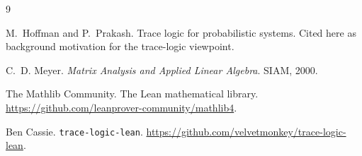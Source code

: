 \documentclass[11pt]{article}
\begin{document}
\begin{thebibliography}{9}

M.~Hoffman and P.~Prakash.
\newblock Trace logic for probabilistic systems.
\newblock Cited here as background motivation for the trace-logic viewpoint.

C.~D. Meyer.
\newblock \emph{Matrix Analysis and Applied Linear Algebra}.
\newblock SIAM, 2000.

The Mathlib Community.
\newblock The Lean mathematical library.
\newblock \url{https://github.com/leanprover-community/mathlib4}.

Ben Cassie.
\newblock \texttt{trace-logic-lean}.
\newblock \url{https://github.com/velvetmonkey/trace-logic-lean}.

\end{thebibliography}
\end{document}
